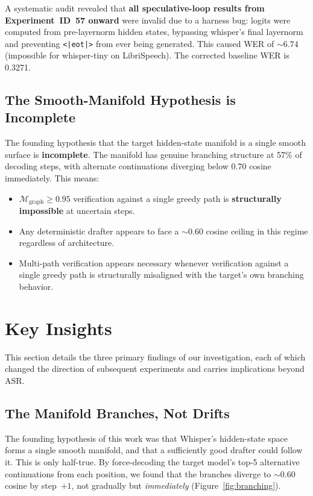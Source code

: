 \documentclass[11pt,a4paper]{article}
\begin{document}
A systematic audit revealed that \textbf{all speculative-loop results from Experiment~ID~57 onward} were invalid due to a harness bug: logits were computed from pre-layernorm hidden states, bypassing whisper's final layernorm and preventing \texttt{<|eot|>} from ever being generated.
This caused WER of ${\sim}6.74$ (impossible for whisper-tiny on LibriSpeech).
The corrected baseline WER is 0.3271.

\subsection{The Smooth-Manifold Hypothesis is Incomplete}

The founding hypothesis that the target hidden-state manifold is a single smooth surface is \textbf{incomplete}.
The manifold has genuine branching structure at 57\% of decoding steps, with alternate continuations diverging below 0.70 cosine immediately.
This means:
\begin{itemize}[leftmargin=*,itemsep=2pt]
    \item $\mathcal{M}_{\mathrm{graph}} \geq 0.95$ verification against a single greedy path is \textbf{structurally impossible} at uncertain steps.
    \item Any deterministic drafter appears to face a ${\sim}0.60$ cosine ceiling in this regime regardless of architecture.
    \item Multi-path verification appears necessary whenever verification against a single greedy path is structurally misaligned with the target's own branching behavior.
\end{itemize}


\section{Key Insights}
\label{sec:insights}

This section details the three primary findings of our investigation, each of which changed the direction of subsequent experiments and carries implications beyond ASR.

\subsection{The Manifold Branches, Not Drifts}

The founding hypothesis of this work was that Whisper's hidden-state space forms a single smooth manifold, and that a sufficiently good drafter could follow it.
This is only half-true.
By force-decoding the target model's top-5 alternative continuations from each position, we found that the branches diverge to ${\sim}0.60$ cosine by step~$+1$, not gradually but \emph{immediately} (Figure~\ref{fig:branching}).
\end{document}
